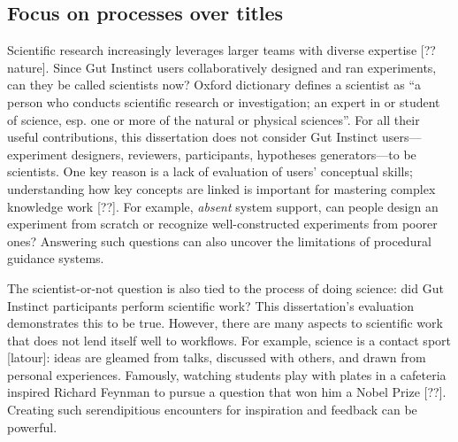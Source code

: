 \subsection{Focus on processes over titles}
Scientific research increasingly leverages larger teams with diverse expertise [??nature]. Since Gut Instinct users collaboratively designed and ran experiments, can they be called scientists now? Oxford dictionary defines a scientist as “a person who conducts scientific research or investigation; an expert in or student of science, esp. one or more of the natural or physical sciences”. For all their useful contributions, this dissertation does not consider Gut Instinct users---experiment designers, reviewers, participants, hypotheses generators---to be scientists. One key reason is a lack of evaluation of users' conceptual skills; understanding how key concepts are linked is important for mastering complex knowledge work [??]. For example, \textit{absent} system support, can people design an experiment from scratch or recognize well-constructed experiments from poorer ones? Answering such questions can also uncover the limitations of procedural guidance systems.

The scientist-or-not question is also tied to the process of doing science: did Gut Instinct participants perform scientific work? This dissertation's evaluation demonstrates this to be true. However, there are many aspects to scientific work that does not lend itself well to workflows. For example, science is a contact sport [latour]: ideas are gleamed from talks, discussed with others, and drawn from personal experiences. Famously, watching students play with plates in a cafeteria inspired Richard Feynman to pursue a question that won him a Nobel Prize [??]. Creating such serendipitious encounters for inspiration and feedback can be powerful.  




